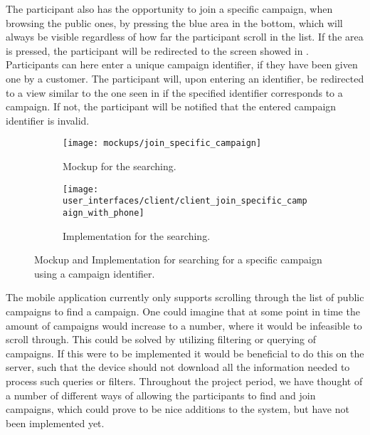 The participant also has the opportunity to join a specific campaign, when browsing the public ones, by pressing the blue area in the bottom, which will always be visible regardless of how far the participant scroll in the list. If the area is pressed, the participant will be redirected to the screen showed in . Participants can here enter a unique campaign identifier, if they have been given one by a customer. The participant will, upon entering an identifier, be redirected to a view similar to the one seen in  if the specified identifier corresponds to a campaign. If not, the participant will be notified that the entered campaign identifier is invalid. 

\begin{figure}[!htbp]
    \begin{subfigure}[!t]{.48\textwidth}
        \centering
        \texttt{[image: mockups/join\_specific\_campaign]}
        \caption{Mockup for the searching.}
        \label{fig:mockup_specific_campaign}
    \end{subfigure}%
    \begin{subfigure}[!t]{.52\textwidth}
        \centering
        \texttt{[image: user\_interfaces/client/client\_join\_specific\_campaign\_with\_phone]}
        \caption{Implementation for the searching.}
        \label{fig:implementation_specific_campaign}
    \end{subfigure}
    \caption{Mockup and Implementation for searching for a specific campaign using a campaign identifier.}
    \label{fig:specific_campaign}
\end{figure}
\FloatBarrier

The mobile application currently only supports scrolling through the list of public campaigns to find a campaign. One could imagine that at some point in time the amount of campaigns would increase to a number, where it would be infeasible to scroll through. This could be solved by utilizing filtering or querying of campaigns. If this were to be implemented it would be beneficial to do this on the server, such that the device should not download all the information needed to process such queries or filters. Throughout the project period, we have thought of a number of different ways of allowing the participants to find and join campaigns, which could prove to be nice additions to the system, but have not been implemented yet.

